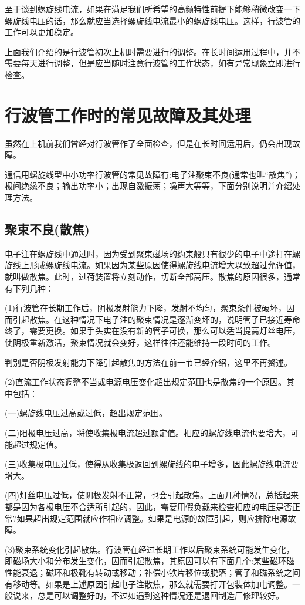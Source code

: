 至于谈到螺旋线电流，如果在满足我们所希望的高频特性前提下能够稍微改变一下螺旋线电压的话，那么就应当选择螺旋线电流最小的螺旋线电压。这样，行波管的工作可以更加稳定。

上面我们介绍的是行波管初次上机时需要进行的调整。在长时间运用过程中，并不需要每天进行调整，但是应当随时注意行波管的工作状态，如有异常现象立即进行检查。
\section{行波管工作时的常见故障及其处理}
虽然在上机前我们曾经对行波管作了全面检查，但是在长时间运用后，仍会出现故障。

通信用螺旋线型中小功率行波管的常见故障有:电子注聚束不良(通常也叫“散焦”)；极间绝缘不良；输出功率小；出现自激振荡；噪声大等等，下面分别说明并介绍处理方法。
\subsection{聚束不良(散焦)}
电子注在螺旋线中通过时，因为受到聚束磁场的约束般只有很少的电子中途打在螺旋线上形成螺旋线电流。如果因为某些原因使得螺旋线电流增大以致超过允许值，就叫做散焦。此时，过荷装置将立刻动作，切断全部高压。散焦的原因很多，通常有下列几种：

(1)行波管在长期工作后，阴极发射能力下降，发射不均匀，聚束条件被破坏，因而引起散焦。在这种情况下电子注的聚束情况是逐渐变坏的，说明管子已接近寿命终了，需要更换。如果手头实在没有新的管子可换，那么可以适当提高灯丝电压，使阴极重新激活，聚束情况就会变好，这样往往还能维持一段时间的工作。

判别是否阴极发射能力下降引起散焦的方法在前一节已经介绍，这里不再赘述。

(2)直流工作状态调整不当或电源电压变化超出规定范围也是散焦的一个原因。其中包括：

(一)螺旋线电压过高或过低，超出规定范围。

(二)阳极电压过高，将使收集极电流超过额定值。相应的螺旋线电流也要增大，可能超过规定值。

(三)收集极电压过低，使得从收集极返回到螺旋线的电子增多，因此螺旋线电流要增大。

(四)灯丝电压过低，使阴极发射不正常，也会引起散焦。上面几种情况，总括起来都是因为各极电压不合适所引起的，因此，需要用假负载来检查相应的电压是否正常?如果超出规定范围就应作相应调整。如果是电源的故障引起，则应排除电源故障。

(3)聚束系统变化引起散焦。行波管在经过长期工作以后聚束系统可能发生变化，即磁场大小和分布发生变化，因而引起散焦，其原因可以有下面几个:某些磁环磁性能衰退；磁环和极靴有转动或移动；补偿小铁片移位或脱落；管子和磁系统之间有移动等。如果是上述原因引起电子注散焦，那么就需要打开包装体加电调整。一般说来，总是可以调整好的，不过如遇到这种情况还是退回制造厂修理较好。

